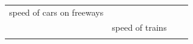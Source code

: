 {\begin{tabular}[t]{|l|l|l|l|}
    
        speed of cars on freeways &
    
    
         &
    
    
     \tabularnewline\cline{1-1}\cline{2-2}\cline{3-3}\cline{4-4}
    
    
         &
    
    
        speed of trains &
    
    
         &
    
    
     \tabularnewline\cline{1-1}\cline{2-2}\cline{3-3}\cline{4-4}
    
    
         &
    

\end{tabular}}
